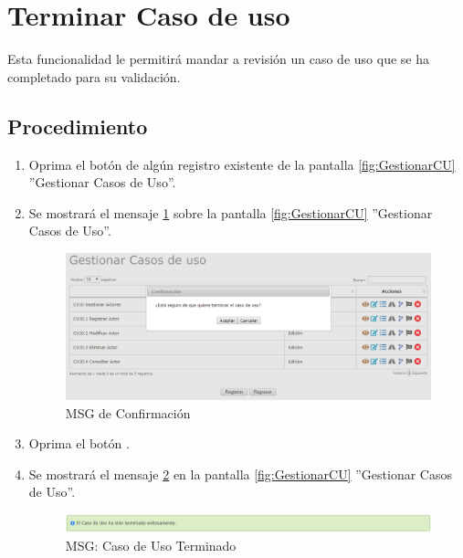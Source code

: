\hypertarget{cv:terminarCU}{\section{Terminar Caso de uso}} \label{sec:terminarCU}

	Esta funcionalidad le permitirá mandar a revisión un caso de uso que se ha completado para su validación.
		\subsection{Procedimiento}

			\begin{enumerate}
			
			\item Oprima el botón \IUTerminar{} de algún registro existente de la pantalla \ref{fig:GestionarCU} ''Gestionar Casos de Uso''.
	
			\item Se mostrará el mensaje \ref{fig:confirmaTerminaCU} sobre la pantalla \ref{fig:GestionarCU} ''Gestionar Casos de Uso''.
			
			\begin{figure}[htbp!]
				\begin{center}
					\includegraphics[scale=0.6]{roles/lider/casosUso/pantallas/IU12-5MSG10}
					\caption{MSG de Confirmación}
					\label{fig:confirmaTerminaCU}
				\end{center}
			\end{figure}
				
				\item Oprima el botón \IUAceptar.
				
				\item Se mostrará el mensaje \ref{fig:CUTerminado} en la pantalla \ref{fig:GestionarCU} ''Gestionar Casos de Uso''.
				
				\begin{figure}[htbp!]
					\begin{center}
						\includegraphics[scale=0.6]{roles/lider/casosUso/pantallas/IU12-5MSG1}
						\caption{MSG: Caso de Uso Terminado}
						\label{fig:CUTerminado}
					\end{center}
				\end{figure}
			
			\end{enumerate}